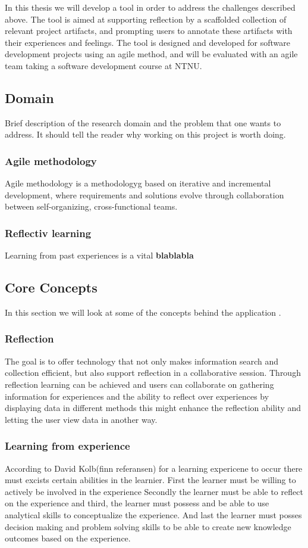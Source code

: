 In this thesis we will develop a tool in order to address the challenges described above. The tool is aimed at supporting reflection by a scaffolded collection of relevant project artifacts, and prompting users to annotate these artifacts with their experiences and feelings. The tool is designed and developed for software development projects using an agile method, and will be evaluated with an agile team taking a software development course at NTNU. 

\subsection{Domain}
Brief description of the research domain and the problem that one
wants to address. It should tell the reader why working on this project is worth
doing.

\subsubsection{Agile methodology}
Agile methodology is a methodologyg based on iterative and incremental development, where requirements and solutions evolve through collaboration between self-organizing, cross-functional teams.

\subsubsection{Reflectiv learning}
Learning from past experiences is a vital \textbf{blablabla}

\subsection{Core Concepts}
In this section we will look at some of the concepts behind the application	.

\subsubsection{Reflection}
The goal is to offer technology that not only makes information search and collection efficient, but also support reflection in a collaborative session. Through reflection learning can be achieved and users can collaborate on gathering information for experiences and the ability to reflect over experiences by displaying data in different methods this might enhance the reflection ability and letting the user view data in another way.

\subsubsection{Learning from experience}
According to David Kolb(finn referansen) for a learning expericene to occur there must excists certain abilities in the learnier. First the learner must be willing to actively be involved in the experience Secondly the learner must be able to reflect on the experience and third, the learner must possess and be able to use analytical skills to conceptualize the experience. And last the learner must posses decision making and problem solving skills to be able to create new knowledge outcomes based on the experience.

